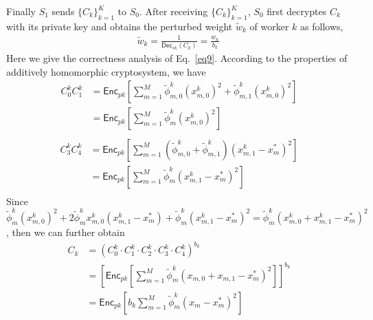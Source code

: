 \documentclass[conference]{IEEEtran}
\begin{document}
Finally $S_1$ sends $\{C_k\}_{k=1}^K$ to $S_0$.
After receiving $\{C_k\}_{k=1}^K$, $S_0$ first decryptes $C_k$ with its private key and obtains the perturbed weight $\tilde{w}_k$ of worker $k$ as follows,
\begin{equation}
  \begin{split}
    \tilde{w}_k = \frac{1}{\mathsf{Dec}_{sk}\left(C_k\right)} = \frac{w_k}{b_k}
  ~\label{eq9}
  \end{split}
\end{equation}
Here we give the correctness analysis of Eq.~\ref{eq9}.
According to the properties of additively homomorphic cryptosystem, we have
\begin{equation}
  \begin{split}
  C_0^k C_1^k & = \mathsf{Enc}_{pk}\left[\sum_{m=1}^M \tilde{\phi}_{m,0}^k\left(x_{m,0}^k\right)^2 + \tilde{\phi}_{m,1}^k\left(x_{m,0}^k\right)^2  \right] \\
   & = \mathsf{Enc}_{pk}\left[\sum_{m=1}^M \tilde{\phi}_m^k\left(x_{m,0}^k\right)^2 \right] \\
  \end{split}
\end{equation}
\begin{equation}
  \begin{split}
  C_3^kC_4^k & = \mathsf{Enc}_{pk}\left[\sum_{m=1}^M \left(\tilde{\phi}_{m,0}^k + \tilde{\phi}_{m,1}^k\right) \left(x_{m,1}^k-x_m^*\right)^2 \right] \\
  & = \mathsf{Enc}_{pk}\left[\sum_{m=1}^M \tilde{\phi}_m^k\left(x_{m,1}^k - x_m^*\right)^2\right] \\
  \end{split}
\end{equation}
Since $\tilde{\phi}_m^k (x_{m,0}^k)^2 + 2\tilde{\phi}_m^kx_{m,0}^k\left(x_{m,1}^k - x_m^*\right) + \tilde{\phi}_m^k(x_{m,1}^k - x_m^*)^2 = \tilde{\phi}_m^k (x_{m,0}^k + x_{m,1}^k - x_m^*)^2$, then we can further obtain
\begin{equation}
  \begin{split}
  C_k & = \left(C_0^k \cdot C_1^k\cdot C_2^k \cdot C_3^k \cdot C_4^k\right)^{b_k} \\
   & = \left[\mathsf{Enc}_{pk}\left[\sum_{m=1}^M \tilde{\phi}_m^k (x_{m,0} + x_{m,1} - x_m^*)^2 \right]\right]^{b_k} \\
  & = \mathsf{Enc}_{pk}\left[b_k \sum_{m=1}^M \tilde{\phi}_m^k (x_m - x_m^*)^2 \right] \\
  \end{split}
\end{equation}
\end{document}
